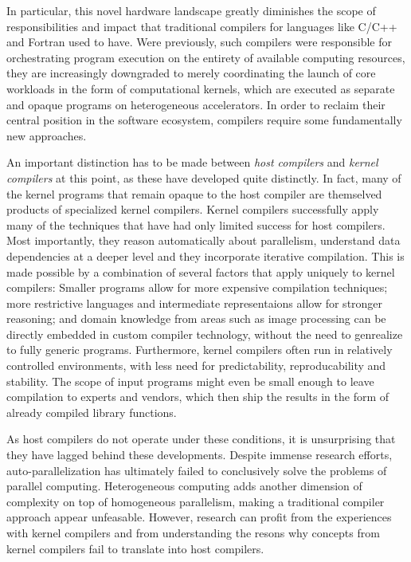     In particular, this novel hardware landscape greatly diminishes the
    scope of responsibilities and impact that traditional compilers for
    languages like C/C++ and Fortran used to have.
    Were previously, such compilers were responsible for orchestrating
    program execution on the entirety of available computing resources, they are
    increasingly downgraded to merely coordinating the launch of core workloads
    in the form of computational kernels, which are executed as separate and
    opaque programs on heterogeneous accelerators.
    In order to reclaim their central position in the software ecosystem,
    compilers require some fundamentally new approaches.

    An important distinction has to be made between {\em host compilers} and
    {\em kernel compilers} at this point, as these have developed quite
    distinctly.
    In fact, many of the kernel programs that remain opaque to the host compiler
    are themselved products of specialized kernel compilers.
    Kernel compilers successfully apply many of the techniques that have had
    only limited success for host compilers.
    Most importantly, they reason automatically about parallelism, understand
    data dependencies at a deeper level and they incorporate iterative
    compilation.
    This is made possible by a combination of several factors that apply
    uniquely to kernel compilers:
    Smaller programs allow for more expensive compilation techniques;
    more restrictive languages and intermediate representaions allow for
    stronger reasoning;
    and domain knowledge from areas such as image processing can be directly
    embedded in custom compiler technology, without the need to genrealize to
    fully generic programs.
    Furthermore, kernel compilers often run in relatively controlled
    environments, with less need for predictability, reproducability and
    stability.
    The scope of input programs might even be small enough to leave compilation
    to experts and vendors, which then ship the results in the form of already
    compiled library functions.

    As host compilers do not operate under these conditions, it is unsurprising
    that they have lagged behind these developments.
    Despite immense research efforts, auto-parallelization has ultimately failed
    to conclusively solve the problems of parallel computing.
    Heterogeneous computing adds another dimension of complexity on top of
    homogeneous parallelism, making a traditional compiler approach appear
    unfeasable.
    However, research can profit from the experiences with kernel compilers
    and from understanding the resons why concepts from kernel compilers fail to
    translate into host compilers.

